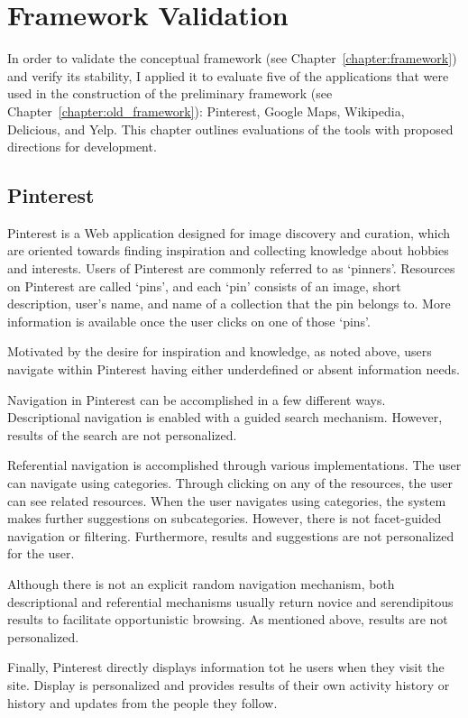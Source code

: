 \chapter{Framework Validation}
\label{chapter:evaluation}

In order to validate the conceptual framework (see Chapter~\ref{chapter:framework}) and verify its stability, I applied it to evaluate five of the applications that were used in the construction of the preliminary framework (see Chapter~\ref{chapter:old_framework}): Pinterest, Google Maps, Wikipedia, Delicious, and Yelp. This chapter outlines evaluations of the tools with proposed directions for development. 

{\section{Pinterest}
Pinterest is a Web application designed for image discovery and curation, which are oriented towards finding inspiration and collecting knowledge about hobbies and interests.  Users of Pinterest are commonly referred to as `pinners'. Resources on Pinterest are called `pins', and each `pin' consists of an image, short description, user's name, and name of a collection that the pin belongs to. More information is available once the user clicks on one of those `pins'.

Motivated by the desire for inspiration and knowledge, as noted above, users navigate within Pinterest having either underdefined or absent information needs. 

Navigation in Pinterest can be accomplished in a few different ways. Descriptional navigation is enabled with a guided search mechanism. However, results of the search are not personalized. 

Referential navigation is accomplished through various implementations. The user can navigate using categories. Through clicking on any of the resources, the user can see related resources. When the user navigates using categories, the system makes further suggestions on subcategories. However, there is not facet-guided navigation or filtering. Furthermore, results and suggestions are not personalized for the user. 

Although there is not an explicit random navigation mechanism, both descriptional and referential mechanisms usually return novice and serendipitous results to facilitate opportunistic browsing. As mentioned above, results are not personalized.

Finally, Pinterest directly displays information tot he users when they visit the site. Display is personalized and provides results of their own activity history or history and updates from the people they follow.

}
